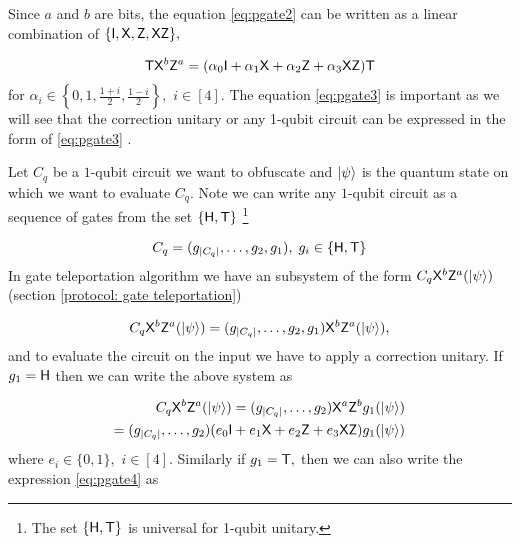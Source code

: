 Since $a$ and $b$ are bits, the equation \ref{eq:pgate2} can be written as a linear combination of $\{{\sf I}, {\sf X}, {\sf Z}, {\sf X} {\sf Z}\},$

\begin{equation}
\label{eq:pgate3}
\begin{aligned}
{\sf T} {\sf X}^b {\sf Z}^a= (\alpha_0 {\sf I} +  \alpha_1 {\sf X} + \alpha_2 {\sf Z} + \alpha_3 {\sf X}{\sf Z}){\sf T} \\
\end{aligned}
\end{equation}
for   $\alpha_i \in\left\{0,1, \frac{1+i}{2}, \frac{1-i}{2}\right\},$  $i\in[4].$ The equation \ref{eq:pgate3} is important as we will see that the correction unitary or any 1-qubit circuit can be expressed in the form of \ref{eq:pgate3} .


Let $C_q$ be a $1$-qubit circuit we want to obfuscate and ${\lvert}\psi\rangle$ is the quantum state on which we want to evaluate $C_q.$ Note we can write any $1$-qubit circuit as a sequence of gates from the set $\{{\sf H}, {\sf T}\}$ \footnote{The set $\{{\sf H},  {\sf T}\}$ is universal for 1-qubit unitary.}

$$C_q=(g_{|C_q|},\ldots,g_2,g_1 ),\; g_i\in\{{\sf H}, {\sf T}\}$$
In gate teleportation algorithm we have an subsystem of the form $C_q {\sf X}^b{\sf Z}^a ({\lvert}\psi\rangle)$ (section \ref{protocol: gate  teleportation}) 

\begin{equation}
\label{eq:pgate4}
C_q {\sf X}^b{\sf Z}^a ({\lvert}\psi\rangle)=(g_{|C_q|},\ldots,g_2,g_1 ){\sf X}^b{\sf Z}^a ({\lvert}\psi\rangle),
\end{equation}
and to evaluate the circuit on the input we have to apply a correction unitary. If $g_1={\sf H}$ then we can write the above system as 

\begin{equation}
\begin{aligned}
\label{eq:pgate5}
C_q {\sf X}^b{\sf Z}^a ({\lvert}\psi\rangle)=(g_{|C_q|},\ldots,g_2)  {\sf X}^a {\sf Z}^b g_1 ({\lvert}\psi\rangle) \\
=(g_{|C_q|},\ldots,g_2)(e_0 {\sf I} +  e_1 {\sf X} + e_2 {\sf Z} + e_3{\sf X} {\sf Z})g_1 ({\lvert}\psi\rangle)
\end{aligned}
\end{equation}
where  $e_i \in \{0,1\},$  $i\in[4].$ Similarly if $g_1={\sf T},$ then we can also write the expression \ref{eq:pgate4} as 

